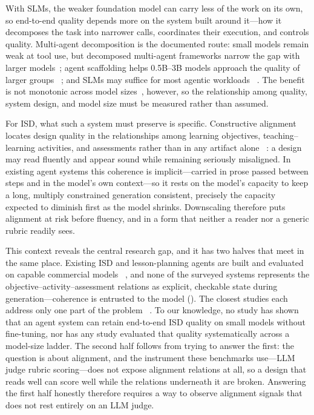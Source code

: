 With SLMs, the weaker foundation model can carry less of the work on its own, so
end-to-end quality depends more on the system built around it---how it
decomposes the task into narrower calls, coordinates their execution, and
controls quality. Multi-agent decomposition is the documented route: small
models remain weak at tool use, but decomposed multi-agent frameworks narrow the
gap with larger models~\cite{shen2024multillmagent}; agent scaffolding helps
0.5B--3B models approach the quality of larger groups
~\cite{kang2025agentdistill}; and SLMs may suffice for most agentic workloads
~\cite{belcak2025slm,sharma2025slmagents}. The benefit is not monotonic
across model sizes~\cite{cho2026harness}, however, so the relationship among
quality, system design, and model size must be measured rather than assumed.

For ISD, what such a system must preserve is specific. Constructive alignment
locates design quality in the relationships among learning objectives,
teaching--learning activities, and assessments rather than in any artifact alone
~\cite{biggs1996enhancing}: a design may read fluently and appear sound while
remaining seriously misaligned. In existing agent systems this coherence is
implicit---carried in prose passed between steps and in the model's own
context---so it rests on the model's capacity to keep a long, multiply
constrained generation consistent, precisely the capacity expected to diminish
first as the model shrinks. Downscaling therefore puts alignment at risk before
fluency, and in a form that neither a reader nor a generic rubric readily sees.

This context reveals the central research gap, and it has two halves that meet in
the same place. Existing ISD and lesson-planning agents are built and evaluated on
capable commercial models
~\cite{yao2025instructionalagents,zhang2025eduplanner,agentlesson2026,hu2024teachingplan,isdagentbench},
and none of the surveyed systems represents the
objective--activity--assessment relations as explicit, checkable state during
generation---coherence is entrusted to the model (). The
closest studies each address only one part of the problem
~\cite{jaldi2026slmassessment,zheng2025lessonplanlm,reza2025smallmodels,lee2026educlaw,wei2026slmeducation}.
To our knowledge, no study has shown that an agent system can retain end-to-end ISD
quality on small models without fine-tuning, nor has any study evaluated that
quality systematically across a model-size ladder. The second half follows from
trying to answer the first: the question is about alignment, and the instrument
these benchmarks use---LLM judge rubric scoring---does not expose alignment
relations at all, so a design that reads well can score well while the relations
underneath it are broken. Answering the first half honestly therefore requires a
way to observe alignment signals that does not rest entirely on an LLM judge.

